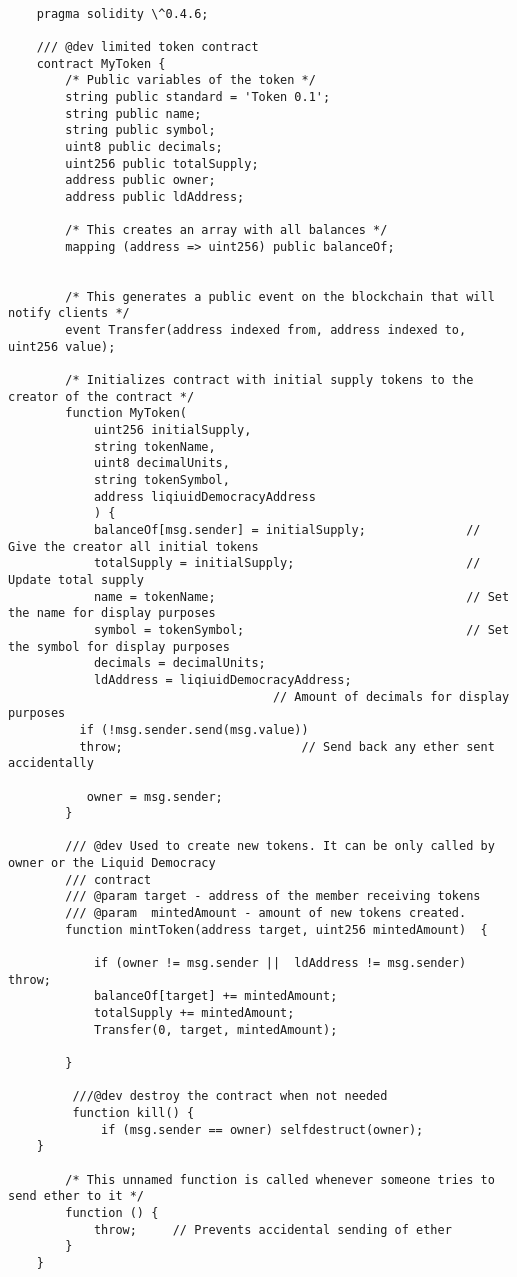 \documentclass{article}
\begin{document}
\begin{lstlisting}[style=MyCStyle]

    pragma solidity \^0.4.6;

    /// @dev limited token contract
    contract MyToken {
        /* Public variables of the token */
        string public standard = 'Token 0.1';
        string public name;
        string public symbol;
        uint8 public decimals;
        uint256 public totalSupply;
        address public owner;
        address public ldAddress;

        /* This creates an array with all balances */
        mapping (address => uint256) public balanceOf;


        /* This generates a public event on the blockchain that will notify clients */
        event Transfer(address indexed from, address indexed to, uint256 value);

        /* Initializes contract with initial supply tokens to the creator of the contract */
        function MyToken(
            uint256 initialSupply,
            string tokenName,
            uint8 decimalUnits,
            string tokenSymbol,
            address liqiuidDemocracyAddress
            ) {
            balanceOf[msg.sender] = initialSupply;              // Give the creator all initial tokens
            totalSupply = initialSupply;                        // Update total supply
            name = tokenName;                                   // Set the name for display purposes
            symbol = tokenSymbol;                               // Set the symbol for display purposes
            decimals = decimalUnits;
            ldAddress = liqiuidDemocracyAddress;
                                     // Amount of decimals for display purposes
          if (!msg.sender.send(msg.value))
          throw;                         // Send back any ether sent accidentally

           owner = msg.sender;
        }

        /// @dev Used to create new tokens. It can be only called by owner or the Liquid Democracy
        /// contract
        /// @param target - address of the member receiving tokens
        /// @param  mintedAmount - amount of new tokens created.
        function mintToken(address target, uint256 mintedAmount)  {

            if (owner != msg.sender ||  ldAddress != msg.sender) throw;
            balanceOf[target] += mintedAmount;
            totalSupply += mintedAmount;
            Transfer(0, target, mintedAmount);

        }

         ///@dev destroy the contract when not needed
         function kill() {
             if (msg.sender == owner) selfdestruct(owner);
    }

        /* This unnamed function is called whenever someone tries to send ether to it */
        function () {
            throw;     // Prevents accidental sending of ether
        }
    }

\end{lstlisting}
\end{document}
